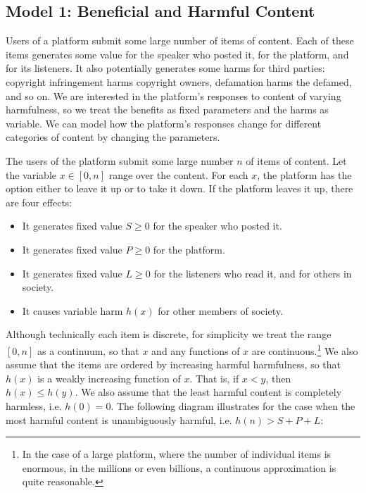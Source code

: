 
\subsection{Model 1: Beneficial and Harmful Content}

Users of a platform submit some large number of items of content. Each of these items generates some value for the speaker who posted it, for the platform, and for its listeners. It also potentially generates some harms for third parties: copyright infringement harms copyright owners, defamation harms the defamed, and so on. We are interested in the platform's responses to content of varying harmfulness, so we treat the benefits as fixed parameters and the harms as variable. We can model how the platform's responses change for different categories of content by changing the parameters.

The users of the platform submit some large number $n$ of items of content. Let the variable $x \in [0,n]$ range over the content. For each $x$, the platform has the option either to leave it up or to take it down. If the platform leaves it up, there are four effects:
\begin{itemize}
\item It generates fixed value $S \ge 0$ for the speaker who posted it.
\item It generates fixed value $P \ge 0$ for the platform.
\item It generates fixed value $L \ge 0$ for the listeners who read it, and for others in society.
\item It causes variable harm $h(x)$ for other members of society.
\end{itemize}
Although technically each item is discrete, for simplicity we treat the range $[0,n]$ as a continuum, so that $x$ and any functions of $x$ are continuous.\footnote{In the  case of a large platform, where the number of individual items is enormous, in the millions or even billions, a continuous approximation is quite reasonable.} We also assume that the items are ordered by increasing harmful harmfulness, so that $h(x)$ is a weakly increasing function of $x$. That is, if $x < y$, then $h(x) \le h(y)$. We also assume that the least harmful content is completely harmless, i.e. $h(0) = 0$. The following diagram illustrates for the case when the most harmful content is unambiguously harmful, i.e.  $h(n) > S + P + L$:

